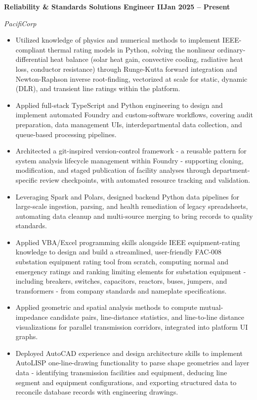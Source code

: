 \documentclass[10pt, letterpaper]{article}
\newcommand{\jobline}[2]{%
  \vspace{5pt}%
  \noindent\textbf{#1}\hfill\textbf{#2}\par%
  \vspace{1pt}%
}
\newcommand{\subline}[1]{%
  \vspace{-1pt}%
  \noindent\textit{#1}\par%
  \vspace{1pt}%
}
\newenvironment{rlist}{%
  \begin{itemize}[leftmargin=1.4em, itemsep=1pt, topsep=2pt, parsep=0pt]%
}{%
  \end{itemize}%
}
\begin{document}
\jobline{Reliability \& Standards Solutions Engineer II}{Jan 2025 -- Present}
\subline{PacifiCorp}
\begin{rlist}
  \item Utilized knowledge of physics and numerical methods to implement IEEE-compliant thermal rating models in Python, solving the nonlinear ordinary-differential heat balance (solar heat gain, convective cooling, radiative heat loss, conductor resistance) through Runge-Kutta forward integration and Newton-Raphson inverse root-finding, vectorized at scale for static, dynamic (DLR), and transient line ratings within the platform.
  \item Applied full-stack TypeScript and Python engineering to design and implement automated Foundry and custom-software workflows, covering audit preparation, data management UIs, interdepartmental data collection, and queue-based processing pipelines.
  \item Architected a git-inspired version-control framework - a reusable pattern for system analysis lifecycle management within Foundry - supporting cloning, modification, and staged publication of facility analyses through department-specific review checkpoints, with automated resource tracking and validation.
  \item Leveraging Spark and Polars, designed backend Python data pipelines for large-scale ingestion, parsing, and health remediation of legacy spreadsheets, automating data cleanup and multi-source merging to bring records to quality standards.
  \item Applied VBA/Excel programming skills alongside IEEE equipment-rating knowledge to design and build a streamlined, user-friendly FAC-008 substation equipment rating tool from scratch, computing normal and emergency ratings and ranking limiting elements for substation equipment - including breakers, switches, capacitors, reactors, buses, jumpers, and transformers - from company standards and nameplate specifications.
  \item Applied geometric and spatial analysis methods to compute mutual-impedance candidate pairs, line-distance statistics, and line-to-line distance visualizations for parallel transmission corridors, integrated into platform UI graphs.
  \item Deployed AutoCAD experience and design architecture skills to implement AutoLISP one-line-drawing functionality to parse shape geometries and layer data - identifying transmission facilities and equipment, deducing line segment and equipment configurations, and exporting structured data to reconcile database records with engineering drawings.
\end{rlist}
\end{document}
